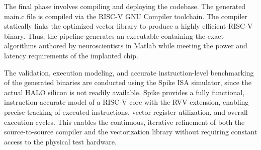 The final phase involves compiling and deploying the codebase. The generated main.c file is compiled via the RISC-V GNU Compiler toolchain. The compiler statically links the optimized vector library to produce a highly efficient RISC-V binary. Thus, the pipeline generates an executable containing the exact algorithms authored by neuroscientists in Matlab while meeting the power and latency requirements of the implanted chip. 

The validation, execution modeling, and accurate instruction-level benchmarking of the generated binaries are conducted using the Spike ISA simulator, since the actual HALO silicon is not readily available. Spike provides a fully functional, instruction-accurate model of a RISC-V core with the RVV extension, enabling precise tracking of executed instructions, vector register utilization, and overall execution cycles. This enables the continuous, iterative refinement of both the source-to-source compiler and the vectorization library without requiring constant access to the physical test hardware.

